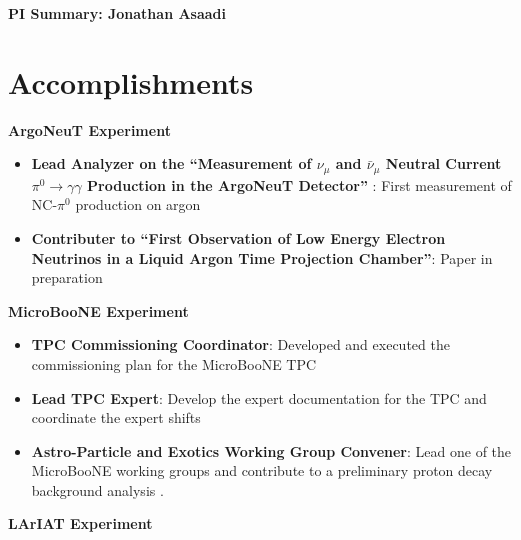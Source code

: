 
\begin{center}
\LARGE\textbf{PI Summary: Jonathan Asaadi}
\end{center}


\section*{\textbf{Accomplishments}}

\noindent\textbf{ArgoNeuT Experiment}
\begin{itemize}[noitemsep,nolistsep]
\item{\textbf{Lead Analyzer on the ``Measurement of $\nu_{\mu}$ and $\bar{\nu}_{\mu}$ Neutral Current $\pi^{0} \rightarrow \gamma\gamma$ Production in the ArgoNeuT Detector''}} : First measurement of NC-$\pi^{0}$ production on argon

\item{\textbf{Contributer to ``First Observation of Low Energy Electron Neutrinos in a Liquid Argon Time Projection Chamber''}}: Paper in preparation

\end{itemize}

\noindent\textbf{MicroBooNE Experiment}
\begin{itemize}[noitemsep,nolistsep]
\item{\textbf{TPC Commissioning Coordinator}}: Developed and executed the commissioning plan for the MicroBooNE TPC

\item{\textbf{Lead TPC Expert}}: Develop the expert documentation for the TPC and coordinate the expert shifts

\item{\textbf{Astro-Particle and Exotics Working Group Convener}}: Lead one of the MicroBooNE working groups and contribute to a preliminary proton decay background analysis \cite{}.

\end{itemize}

\noindent\textbf{LArIAT Experiment}

